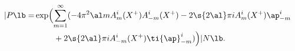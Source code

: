 \begin{equation}
\begin{split}
|P\lb
=&\exp\Bigl(\sum_{m=1}^{\infty}(-4\pi^2\al mA^i_{m}(X^+)A^i_{-m}(X^+)
-2\s{2\al}\pi iA^i_{m}(X^+)
\ap^i_{-m}\\
&\ \ \ \ \ \ \ +2\s{2\al}\pi iA^i_{-m}(X^+)\ti{\ap}^i_{-m})
\Bigr)|N\lb.
\label{bspo}
\end{split}
\end{equation}

